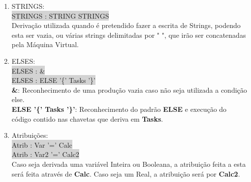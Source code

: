 \documentclass{report}
\begin{document}
\begin{enumerate}
\item{STRINGS}:\\
\colorbox{lightgray}{STRINGS : STRING STRINGS}\\
Derivação utilizada quando é pretendido fazer a escrita de Strings, podendo esta ser vazia, ou várias strings delimitadas por " ", que irão ser concatenadas pela Máquina Virtual.

\item{ELSES}:\\
\colorbox{lightgray}{ELSES : \&}\\
\colorbox{lightgray}{ELSES : ELSE '\{' Tasks '\}'}\\
\textbf{\&}: Reconhecimento de uma produção vazia caso não seja utilizada a condição else.\\
\textbf{ELSE '\{' Tasks '\}'}: Reconhecimento do padrão \textbf{ELSE} e execução do código contido nas chavetas que deriva em \textbf{Tasks}.

\item{Atribuições}:\\
\colorbox{lightgray}{Atrib : Var '=' Calc}\\
\colorbox{lightgray}{Atrib : Var2 '=' Calc2}\\
Caso seja derivada uma variável Inteira ou Booleana, a atribuição feita a esta será feita através de \textbf{Calc}. Caso seja um Real, a atribuição será por \textbf{Calc2}.\\


\end{enumerate}
\end{document}
